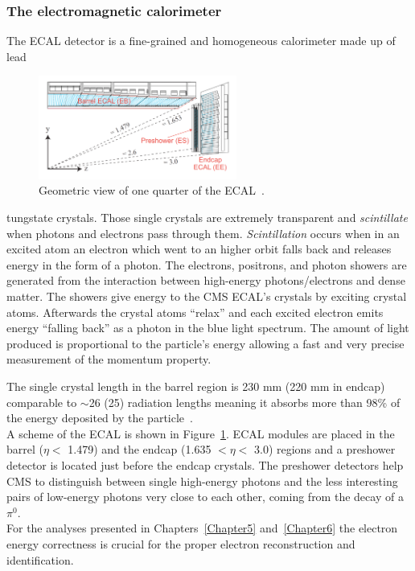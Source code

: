 \subsubsection{The electromagnetic calorimeter}
The ECAL detector is a fine-grained and homogeneous calorimeter
made up of lead
\begin{figure}
  \begin{center}
    \includegraphics[clip,trim=1cm 1cm 1cm 1.9cm, width=0.58\textwidth]{Figures/c2/ecal}
  \end{center}
  \caption{Geometric view of one quarter of the ECAL~\cite{Benaglia_2014}.}
\label{fig:ecal}
\end{figure}
 tungstate crystals. Those single crystals are extremely transparent
 and \emph{scintillate} when photons and electrons pass through
 them. \emph{Scintillation} occurs when in an excited atom an electron
 which went to an higher orbit falls back and
 releases energy in the form of a photon. The electrons, positrons, and
 photon showers are generated from the interaction between high-energy photons/electrons and
 dense matter. The showers give energy to the CMS ECAL's crystals by
 exciting crystal atoms. Afterwards the crystal atoms ``relax'' and each
 excited electron
 emits energy ``falling back'' as a photon in the blue light spectrum.
The amount of light produced is proportional to the particle's energy
 allowing a fast and very precise measurement of the momentum
 property. 

The single crystal length in the barrel region is 230 mm (220
 mm in endcap) comparable to $\sim$26 (25) radiation lengths meaning it
 absorbs more than 98\% of the energy deposited by the particle~\cite{Biino_2015}.\\
A scheme of the ECAL is shown in Figure~\ref{fig:ecal}.
ECAL modules are placed in the barrel ($\eta<$ 1.479) and the endcap
(1.635 $<\eta<$ 3.0) regions and a preshower detector is located just
before the endcap crystals. The preshower detectors help CMS to
distinguish between single high-energy photons and the less
interesting pairs of low-energy photons very close to each other, \ie
coming from the decay of a $\pi^0$. \\
For the analyses presented in Chapters~\ref{Chapter5}
and~\ref{Chapter6} the electron energy correctness is crucial for the
proper electron reconstruction and identification.

